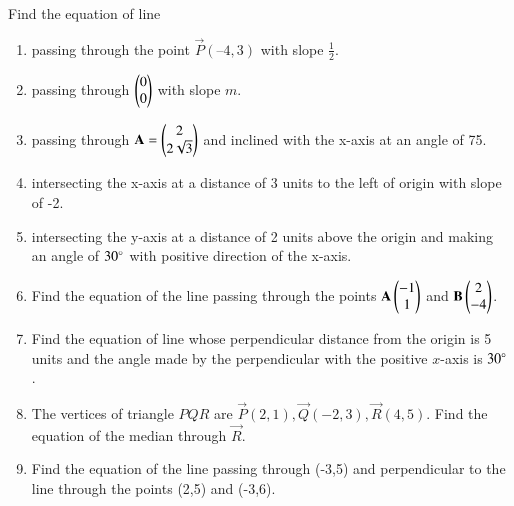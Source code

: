 Find the equation of line 
\begin{enumerate}[label=\thesection.\arabic*,ref=\thesection.\theenumi]
	\item passing through the point $\vec{P}(– 4, 3)$ with slope $\frac{1}{2}$.
\label{chapters/11/10/2/2}
\\
\solution

	\item passing through $\begin{pmatrix}0\\0\end{pmatrix}$ with slope $m$.\\
\label{chapters/11/10/2/3}
\solution

    \item passing through 
    $\mathbf{A} = \begin{pmatrix}2\\2\sqrt{3}\end{pmatrix}$ and inclined with the x-axis at an angle 
    of 75\textdegree.
\label{chapters/11/10/2/4}
\\
    \solution 

\item intersecting the x-axis at a distance of 3 units to the left of origin with slope of -2.
\label{chapters/11/10/2/5}
\\
\solution 

\item intersecting the y-axis at a distance of 2 units above the origin and making an
angle of $30\degree$ with positive direction of the x-axis.
\\
\solution 

\item Find the equation of the line passing through the points $\mathbf{A}\begin{pmatrix}-1\\1\end{pmatrix}$ and $\mathbf{B}\begin{pmatrix}2\\-4\end{pmatrix}$.
\\
\solution 

\item Find the equation of line whose perpendicular distance from the origin is 5 units and the angle made by the perpendicular with the positive $x$-axis is $30\degree$.
\label{chapters/11/10/2/8}
\\
\solution

\item 
The vertices of triangle $PQR$ are $\vec{P}(2,1), \vec{Q}(-2,3), \vec{R}(4,5)$. Find the equation of the median through $\vec{R}$.
\label{chapters/11/10/2/9}
\\
\solution

\item 
	Find the equation of the line passing through  (-3,5) and perpendicular to the line through the points (2,5) and (-3,6).
	\\

\end{enumerate}
